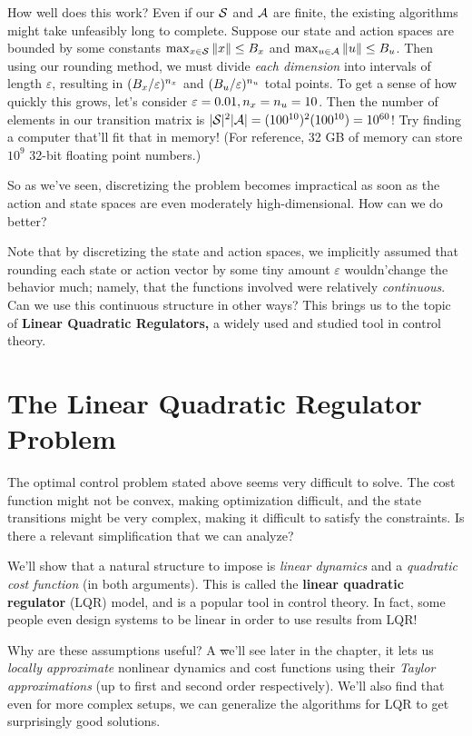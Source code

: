 \documentclass[../main/main]{subfiles}
\begin{document}
How well does this work? Even if our $\S$ and $\A$ are
finite, the existing algorithms might take unfeasibly long to complete.
Suppose our state and action spaces
are bounded by some constants $\max_{\st \in \S} \|\st\| \le B_\st$ and
$\max_{\act \in \A} \|\act\| \le B_\act$.
Then using our rounding method, we must divide \emph{each dimension} into intervals of length $\varepsilon$,
resulting in $(B_\st/\varepsilon)^{n_\st}$ and $(B_\act/\varepsilon)^{n_\act}$ total points.
To get a sense of how quickly this grows, let's consider $\varepsilon = 0.01, n_\st = n_\act = 10$. Then the number of elements in our transition matrix is $|\S|^2 |\A| = (100^{10})^2 (100^{10}) = 10^{60}$!
Try finding a computer that'll fit that in memory! (For reference, 32 GB of memory can store $10^9$ 32-bit floating point numbers.)

So as we've seen, discretizing the problem becomes impractical as soon as
the action and state spaces are even moderately high-dimensional.
How can we do better?

Note that by discretizing the state and action spaces, we implicitly assumed that rounding each state or action vector by some tiny amount $\varepsilon$
wouldn'\hi change the behavior much; namely, that the functions involved were relatively \emph{continuous}.
Can we use this continuous structure in other ways? This brings us to the topic of \textbf{Linear Quadratic Regulators,} a widely used and studied tool in control theory.

\section{The Linear Quadratic Regulator Problem} \label{sec:lqr}

The optimal control problem stated above seems very difficult to solve.
The cost function might not be convex, making optimization difficult,
and the state transitions might be very complex, making it difficult to satisfy the constraints.
Is there a relevant simplification that we can analyze?

We'll show that a natural structure to impose is \emph{linear dynamics} and a \emph{quadratic cost function} (in both arguments). This is called the \textbf{linear quadratic regulator} (LQR) model, and is a popular tool in control theory.
In fact, some people even design systems to be linear in order to use results from LQR!

Why are these assumptions useful? A \st we'll see later in the chapter, it lets us \emph{locally approximate} nonlinear dynamics and cost functions
using their \emph{Taylor approximations} (up to first and second order respectively).
We'll also find that even for more complex setups,
we can generalize the algorithms for LQR to get surprisingly good solutions.
\end{document}
